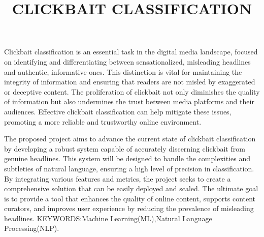 \documentclass[12pt,a4paper]{article}
\begin{document}
\title{CLICKBAIT CLASSIFICATION}
\maketitle

 Clickbait classification is an essential task in the digital media landscape, focused on identifying and differentiating between sensationalized, misleading headlines and authentic, informative ones. This distinction is vital for maintaining the integrity of information and ensuring that readers are not misled by exaggerated or deceptive content. The proliferation of clickbait not only diminishes the quality of information but also undermines the trust between media platforms and their audiences. Effective clickbait classification can help mitigate these issues, promoting a more reliable and trustworthy online environment.

The proposed project aims to advance the current state of clickbait classification by developing a robust system capable of accurately discerning clickbait from genuine headlines. This system will be designed to handle the complexities and subtleties of natural language, ensuring a high level of precision in classification. By integrating various features and metrics, the project seeks to create a comprehensive solution that can be easily deployed and scaled. The ultimate goal is to provide a tool that enhances the quality of online content, supports content curators, and improves user experience by reducing the prevalence of misleading headlines.
\newline
KEYWORDS:Machine Learning(ML),Natural Language Processing(NLP).
\end{document}
